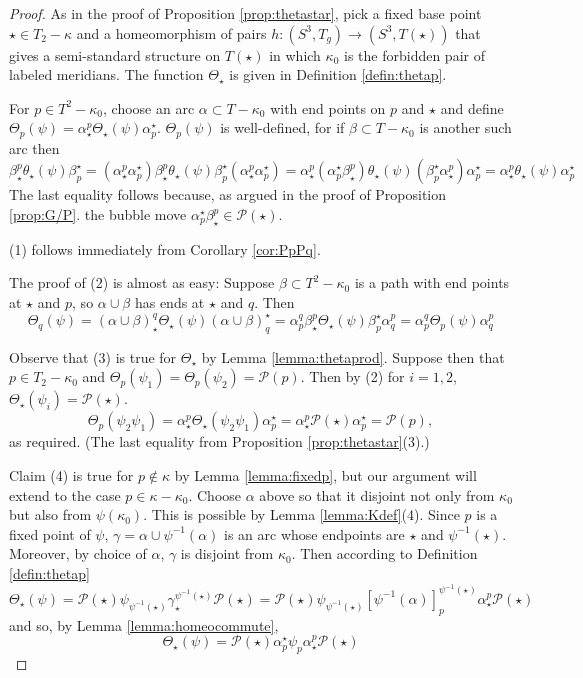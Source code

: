\documentclass[10pt,a4paper]{amsart}
\newcommand{\calP}{\mathcal P}
\begin{document}
\begin{proof} As in the proof of Proposition \ref{prop:thetastar}, pick a fixed base point $\star \in T_2 - \kappa$ and a homeomorphism of pairs $h:(S^3, T_g) \to (S^3, T(\star))$ that gives a semi-standard structure on $T(\star)$ in which $\kappa_0$ is the forbidden pair of labeled meridians.   The function $\Theta_{\star}$ is given in Definition \ref{defin:thetap}.  

For $p \in T^2 - \kappa_0$, choose an arc $\alpha \subset T - \kappa_0$ with end points on $p$ and $\star$ and define $\Theta_p(\psi) =  \alpha_{\star}^p \Theta_{\star}(\psi) \alpha_p^{\star}$.  $\Theta_p(\psi)$ is well-defined, for if $\beta \subset T - \kappa_0$ is another such arc then 
\[ \beta_{\star}^p \theta_{\star}(\psi) \beta_p^{\star} = (\alpha_{\star}^p\alpha^{\star}_p)\beta_{\star}^p \theta_{\star}(\psi) \beta_p^{\star}(\alpha_{\star}^p\alpha^{\star}_p) = \alpha_{\star}^p(\alpha^{\star}_p\beta_{\star}^p) \theta_{\star}(\psi)( \beta_p^{\star}\alpha_{\star}^p)\alpha^{\star}_p = \alpha_{\star}^p \theta_{\star}(\psi)\alpha^{\star}_p\]
The last equality follows because, as argued in the proof of Proposition \ref{prop:G/P}.  the bubble move $\alpha^{\star}_p\beta_{\star}^p \in \calP(\star)$.  

 (1) follows immediately from Corollary \ref{cor:PpPq}.  

The proof of (2) is almost as easy: Suppose $\beta \subset T^2 - \kappa_0$ is a path with end points at $\star$ and $p$, so $\alpha \cup \beta$ has ends at $\star$ and $q$.  Then 
\[ \Theta_q(\psi) = (\alpha \cup \beta)_{\star}^q \Theta_{\star}(\psi) (\alpha \cup \beta)^{\star}_q  =    \alpha_p^q \beta_{\star}^p \Theta_{\star}(\psi) \beta^{\star}_p \alpha_q^p  = \alpha_p^q \Theta_p(\psi) \alpha_q^p \]

Observe that (3) is true for $\Theta_{\star}$ by Lemma \ref{lemma:thetaprod}.  Suppose then that $p \in T_2 - \kappa_0$ and $\Theta_p(\psi_1) = \Theta_p(\psi_2) = \calP(p)$.  Then by (2)
for $i = 1, 2$, $\Theta_{\star}(\psi_i) = \calP(\star)$.  
\[\Theta_p(\psi_2\psi_1) =  \alpha_{\star}^p \Theta_{\star}(\psi_2 \psi_1) \alpha^{\star}_p = \alpha_{\star}^p \calP(\star) \alpha^{\star}_p  = \calP(p),\]
as required.  (The last equality from Proposition \ref{prop:thetastar}(3).)

Claim (4) is true for $p \notin \kappa$ by Lemma \ref{lemma:fixedp}, but our argument will extend to the case $p \in \kappa - \kappa_0$.  Choose $\alpha$ above so that it disjoint not only from $\kappa_0$ but also from $\psi(\kappa_0)$.  This is possible by Lemma \ref{lemma:Kdef}(4).  Since $p$ is a fixed point of $\psi$,  $\gamma = \alpha \cup \psi^{-1}(\alpha)$ is an arc whose endpoints are $\star$ and $\psi^{-1}(\star)$.  Moreover, by choice of $\alpha$, $\gamma$ is disjoint from $\kappa_0$.  Then according to Definition \ref{defin:thetap} 
\[\Theta_{\star}(\psi) = \calP(\star) \psi_{\psi^{-1}(\star)} \gamma_{\star}^{\psi^{-1}(\star)} \calP(\star) = \calP(\star) \psi_{\psi^{-1}(\star)} [\psi^{-1}(\alpha)]_p^{\psi^{-1}(\star)} \alpha_{\star}^p \calP(\star) \]
and so, by  Lemma \ref{lemma:homeocommute}, 
\[\Theta_{\star}(\psi) =  \calP(\star) \alpha_p^{\star} \psi_p \alpha_{\star}^p \calP(\star)  \] 


\end{proof}
\end{document}
